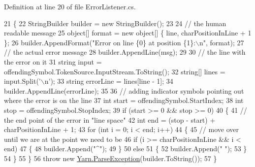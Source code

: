 Definition at line 20 of file Error\-Listener.\-cs.


\begin{DoxyCode}
21         \{
22             StringBuilder builder = \textcolor{keyword}{new} StringBuilder();
23 
24             \textcolor{comment}{// the human readable message}
25             \textcolor{keywordtype}{object}[] format = \textcolor{keyword}{new} \textcolor{keywordtype}{object}[] \{ line, charPositionInLine + 1 \};
26             builder.AppendFormat(\textcolor{stringliteral}{"Error on line \{0\} at position \{1\}:\(\backslash\)n"}, format);
27             \textcolor{comment}{// the actual error message}
28             builder.AppendLine(msg);
29 
30             \textcolor{comment}{// the line with the error on it}
31             \textcolor{keywordtype}{string} input = offendingSymbol.TokenSource.InputStream.ToString();
32             \textcolor{keywordtype}{string}[] lines = input.Split(\textcolor{charliteral}{'\(\backslash\)n'});
33             \textcolor{keywordtype}{string} errorLine = lines[line - 1];
34             builder.AppendLine(errorLine);
35 
36             \textcolor{comment}{// adding indicator symbols pointing out where the error is on the line}
37             \textcolor{keywordtype}{int} start = offendingSymbol.StartIndex;
38             \textcolor{keywordtype}{int} stop = offendingSymbol.StopIndex;
39             \textcolor{keywordflow}{if} (start >= 0 && stop >= 0)
40             \{
41                 \textcolor{comment}{// the end point of the error in "line space"}
42                 \textcolor{keywordtype}{int} end = (stop - start) + charPositionInLine + 1;
43                 \textcolor{keywordflow}{for} (\textcolor{keywordtype}{int} i = 0; i < end; i++)
44                 \{
45                     \textcolor{comment}{// move over until we are at the point we need to be}
46                     \textcolor{keywordflow}{if} (i >= charPositionInLine && i < end)
47                     \{
48                         builder.Append(\textcolor{stringliteral}{"^"});
49                     \}
50                     \textcolor{keywordflow}{else}
51                     \{
52                         builder.Append(\textcolor{stringliteral}{" "});
53                     \}
54                 \}
55             \}
56             \textcolor{keywordflow}{throw} \textcolor{keyword}{new} \hyperlink{a00137}{Yarn.ParseException}(builder.ToString());
57         \}
\end{DoxyCode}


